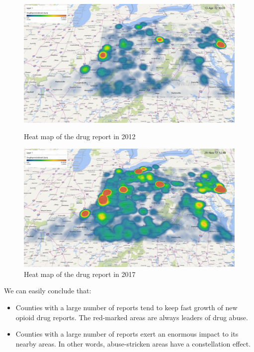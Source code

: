 \documentclass{mcmthesis}
\begin{document}
\begin{figure}[htbp!]
  \begin{flushleft}
  	\begin{minipage}[t]{0.3\textwidth}
  \centering
  \includegraphics[scale=0.1]{s1.png}
  \caption{Heat map of the drug report in 2012}\label{2}
  \end{minipage}
  \qquad\qquad\qquad\qquad
  	\begin{minipage}[t]{0.3\textwidth}
  \centering
  \includegraphics[scale=0.1]{s2.png}
  \caption{Heat map of the drug report in 2017}\label{3}
  \end{minipage}
  \end{flushleft}
  
\end{figure}

We can easily conclude that:
\begin{itemize}
	\item Counties with a large number of reports tend to keep fast growth of new opioid drug reports. The red-marked areas are always leaders of drug abuse.
	\item Counties with a large number of reports exert an enormous impact to its nearby areas. In other words, abuse-stricken areas have a constellation effect.
\end{itemize}
\end{document}
